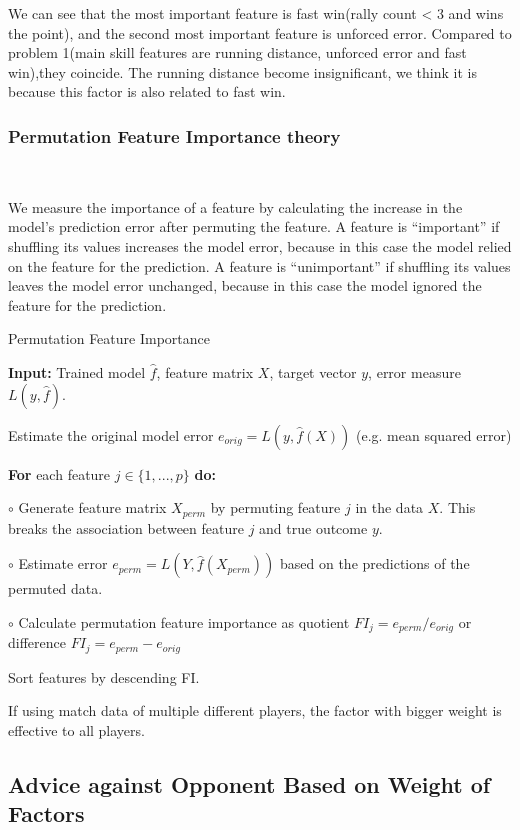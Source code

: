 We can see that the most important feature is fast win(rally count < 3 and wins the point),
and the second most important feature is unforced error. Compared to problem 1(main skill features are
running distance, unforced error and fast win),they coincide. The running distance become insignificant, 
we think it is because this factor is also related to fast win.

\subsubsection{Permutation Feature Importance theory}~{}

We measure the importance of a feature by calculating the increase in the model’s prediction error 
after permuting the feature. A feature is “important” if shuffling its values increases the model error, 
because in this case the model relied on the feature for the prediction. A feature is “unimportant” if 
shuffling its values leaves the model error unchanged, because in this case the model ignored the feature 
for the prediction. 

\begin{algorithm}  
    \caption{Permutation Feature Importance}  
    \textbf{Input:} Trained model $\hat{f}$, feature matrix $X$, target vector $y$, error measure $L(y, \hat{f})$.  
      
    Estimate the original model error $e_{orig} = L(y, \hat{f}(X))$ (e.g. mean squared error)  
      
    \textbf{For} each feature $j \in \{1, ..., p\}$ \textbf{do:}  
      
    \quad\quad $\circ$ Generate feature matrix $X_{perm}$ by permuting feature $j$ in the data $X$. This breaks the association between feature $j$ and true outcome $y$.  
      
    \quad\quad $\circ$ Estimate error $e_{perm} = L(Y, \hat{f}(X_{perm}))$ based on the predictions of the permuted data.  
      
    \quad\quad $\circ$ Calculate permutation feature importance as quotient $FI_j = e_{perm} / e_{orig}$ or difference $FI_j = e_{perm} - e_{orig}$  
      
    Sort features by descending FI.
\end{algorithm}

If using match data of multiple different players, the factor with bigger weight is effective to 
all players.

\subsection{Advice against Opponent Based on Weight of Factors}~{}

